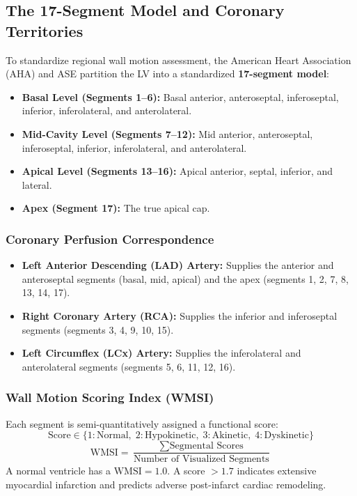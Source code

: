 \documentclass[11pt,a4paper]{article}
\begin{document}
\subsection{The 17-Segment Model and Coronary Territories}

To standardize regional wall motion assessment, the American Heart Association (AHA) and ASE partition the LV into a standardized \textbf{17-segment model}:
\begin{itemize}[leftmargin=*]
    \item \textbf{Basal Level (Segments 1--6):} Basal anterior, anteroseptal, inferoseptal, inferior, inferolateral, and anterolateral.
    \item \textbf{Mid-Cavity Level (Segments 7--12):} Mid anterior, anteroseptal, inferoseptal, inferior, inferolateral, and anterolateral.
    \item \textbf{Apical Level (Segments 13--16):} Apical anterior, septal, inferior, and lateral.
    \item \textbf{Apex (Segment 17):} The true apical cap.
\end{itemize}

\subsubsection{Coronary Perfusion Correspondence}
\begin{itemize}[leftmargin=*]
    \item \textbf{Left Anterior Descending (LAD) Artery:} Supplies the anterior and anteroseptal segments (basal, mid, apical) and the apex (segments 1, 2, 7, 8, 13, 14, 17).
    \item \textbf{Right Coronary Artery (RCA):} Supplies the inferior and inferoseptal segments (segments 3, 4, 9, 10, 15).
    \item \textbf{Left Circumflex (LCx) Artery:} Supplies the inferolateral and anterolateral segments (segments 5, 6, 11, 12, 16).
\end{itemize}

\subsubsection{Wall Motion Scoring Index (WMSI)}
Each segment is semi-quantitatively assigned a functional score:
\begin{equation}
    \text{Score} \in \{ 1: \text{Normal}, \; 2: \text{Hypokinetic}, \; 3: \text{Akinetic}, \; 4: \text{Dyskinetic} \}
\end{equation}
\begin{equation}
    \text{WMSI} = \frac{\sum \text{Segmental Scores}}{\text{Number of Visualized Segments}}
\end{equation}
A normal ventricle has a $\text{WMSI} = 1.0$. A score $> 1.7$ indicates extensive myocardial infarction and predicts adverse post-infarct cardiac remodeling.
\end{document}
